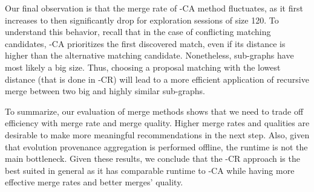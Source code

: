 Our final observation is that the merge rate of \mlm{}-CA method fluctuates, as it first increases to then significantly drop for exploration sessions of size 120. To understand this behavior, recall that in the case of conflicting matching candidates, \mlm{}-CA prioritizes the first discovered match, even if its distance is higher than the alternative matching candidate. Nonetheless, sub-graphs have most likely a big size. Thus, choosing a proposal matching with the lowest distance (that is done in \mlm{}-CR) will lead to a more efficient application of recursive merge between two big and highly similar sub-graphs.


To summarize, our evaluation of merge methods shows that we need to trade off efficiency with merge rate and merge quality. Higher merge rates and qualities are desirable to make more meaningful recommendations in the next step. Also, given that evolution provenance aggregation is performed offline, the runtime is not the main bottleneck. Given these results, we conclude that the \mlm{}-CR approach is the best suited in general 
as it has comparable runtime to \mlm{}-CA while having more effective merge rates and better merges' quality.
